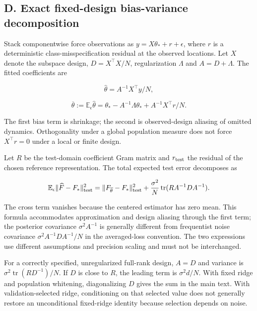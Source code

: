 \documentclass[
  10pt,
]{article}
\begin{document}
\hypertarget{d.-exact-fixed-design-bias-variance-decomposition}{%
\subsection*{D. Exact fixed-design bias-variance
decomposition}\label{d.-exact-fixed-design-bias-variance-decomposition}}

Stack componentwise force observations as \(y=X\theta_*+r+\epsilon\),
where \(r\) is a deterministic class-misspecification residual at the
observed locations. Let \(X\) denote the subspace design,
\(D=X^\top X/N\), regularization \(\Lambda\) and \(A=D+\Lambda\). The
fitted coefficients are

\[\widehat\theta=A^{-1}X^\top y/N,\]

\[\overline\theta:=\mathbb E_\epsilon\widehat\theta
=\theta_*-A^{-1}\Lambda\theta_*+A^{-1}X^\top r/N.\]

The first bias term is shrinkage; the second is observed-design aliasing
of omitted dynamics. Orthogonality under a global population measure
does not force \(X^\top r=0\) under a local or finite design.

Let \(R\) be the test-domain coefficient Gram matrix and
\(r_{\rm test}\) the residual of the chosen reference representation.
The total expected test error decomposes as

\[\mathbb E_\epsilon\|\widehat F-F_*\|_{\rm test}^2
=\|F_{\overline\theta}-F_*\|_{\rm test}^2
+\frac{\sigma^2}{N}\operatorname{tr}(RA^{-1}DA^{-1}).\]

The cross term vanishes because the centered estimator has zero mean.
This formula accommodates approximation and design aliasing through the
first term; the posterior covariance \(\sigma^2A^{-1}\) is generally
different from frequentist noise covariance \(\sigma^2A^{-1}DA^{-1}/N\)
in the averaged-loss convention. The two expressions use different
assumptions and precision scaling and must not be interchanged.

For a correctly specified, unregularized full-rank design, \(A=D\) and
variance is \(\sigma^2\operatorname{tr}(RD^{-1})/N\). If \(D\) is close
to \(R\), the leading term is \(\sigma^2 d/N\). With fixed ridge and
population whitening, diagonalizing \(D\) gives the sum in the main
text. With validation-selected ridge, conditioning on that selected
value does not generally restore an unconditional fixed-ridge identity
because selection depends on noise.
\end{document}
